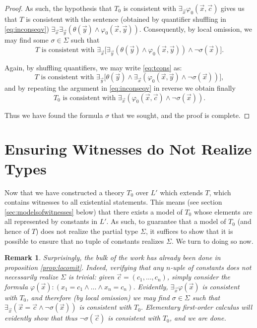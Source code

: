 \documentclass{article}
\newtheorem{remark}{Remark}
\theoremstyle{nonumberplain}
\newtheorem{proof}{Proof}
\begin{document}
\begin{proof}
As such, the hypothesis that $T_0$ is consistent with $\exists_{\vec x} \varphi_0(\vec x, \vec c)$ gives us that $T$ is consistent with the sentence (obtained by quantifier shuffling in \eqref{eq:inconseqv}) $\exists_{\vec x} \exists_{\vec y} (\theta(\vec y) \land \varphi_0(\vec x, \vec y))$. Consequently, by local omission, we may find some $\sigma \in \Sigma$ such that
\begin{equation}\label{eq:tcons}
T \text{ is consistent with } \exists_{\vec x} \big[ \exists_{\vec y} (\theta(\vec y) \land \varphi_0(\vec x, \vec y)) \land \neg \sigma(\vec x) \big].
\end{equation}

Again, by shuffling quantifiers, we may write \eqref{eq:tcons} as:
\begin{equation}
T \text{ is consistent with } \exists_{\vec y} \big[ \theta(\vec y) \land \exists_{\vec x}(\varphi_0(\vec x, \vec y) \land \neg \sigma(\vec x)) \big],
\end{equation}
and by repeating the argument in \eqref{eq:inconseqv} in reverse we obtain finally
\begin{equation}
T_0 \text{ is consistent with } \exists_{\vec x} (\varphi_0(\vec x, \vec c) \land \neg \sigma(\vec x)).
\end{equation}

Thus we have found the formula $\sigma$ that we sought, and the proof is complete.
\end{proof}

\section{Ensuring Witnesses do Not Realize Types}

Now that we have constructed a theory $T_0$ over $L'$ which extends $T$, which contains witnesses to all existential statements. This means (see section \ref{sec:modelsofwitnesses} below) that there exists a model of $T_0$ whose elements are all represented by constants in $L'$. As such, to guarantee that a model of $T_0$ (and hence of $T$) does not realize the partial type $\Sigma$, it suffices to show that it is possible to ensure that no tuple of constants realizes $\Sigma$. We turn to doing so now.

\begin{remark}\label{rmk:bulk}
Surprisingly, the bulk of the work has already been done in proposition \ref{prop:locomit}. Indeed, verifying that any $n$-uple of constants does not necessarily realize $\Sigma$ is trivial: given $\vec c = (c_1, \dots, c_n)$, simply consider the formula $\varphi(\vec x) \colon (x_1 = c_1 \land \dots \land x_n = c_n)$. Evidently, $\exists_{\vec x} \varphi(\vec x)$ is consistent with $T_0$, and therefore (by local omission) we may find $\sigma \in \Sigma$ such that $\exists_{\vec x} (\vec x = \vec c \land \neg \sigma(\vec x))$ is consistent with $T_0$. Elementary first-order calculus will evidently show that thus $\neg \sigma(\vec c)$ is consistent with $T_0$, and we are done.
\end{remark}
\end{document}
